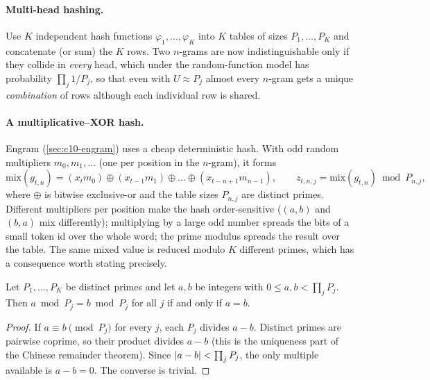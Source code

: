 \paragraph{Multi-head hashing.} Use $K$ independent hash functions $\varphi_1,\dots,\varphi_K$
into $K$ tables of sizes $P_1,\dots,P_K$ and concatenate (or sum) the $K$ rows. Two $n$-grams are
now indistinguishable only if they collide in \emph{every} head, which under the random-function
model has probability $\prod_j 1/P_j$, so that even with $U \approx P_j$ almost every $n$-gram
gets a unique \emph{combination} of rows although each individual row is shared.

\paragraph{A multiplicative--XOR hash.} Engram (\cref{sec:c10-engram}) uses a cheap deterministic
hash. With odd random multipliers $m_0, m_1, \dots$ (one per position in the $n$-gram), it forms
\begin{equation}
  \mathrm{mix}(g_{t,n}) = (x_t m_0) \oplus (x_{t-1} m_1) \oplus \dots \oplus (x_{t-n+1} m_{n-1}),
  \qquad
  z_{t,n,j} = \mathrm{mix}(g_{t,n}) \bmod P_{n,j},
  \label{eq:c10-mixhash}
\end{equation}
where $\oplus$ is bitwise exclusive-or and the table sizes $P_{n,j}$ are distinct primes. Different
multipliers per position make the hash order-sensitive ($(a,b)$ and $(b,a)$ mix differently);
multiplying by a large odd number spreads the bits of a small token id over the whole word; the
prime modulus spreads the result over the table. The same mixed value is reduced modulo $K$
different primes, which has a consequence worth stating precisely.

\begin{proposition}\label{prop:c10-crt}
Let $P_1,\dots,P_K$ be distinct primes and let $a, b$ be integers with $0 \le a, b < \prod_j P_j$.
Then $a \bmod P_j = b \bmod P_j$ for all $j$ if and only if $a = b$.
\end{proposition}
\begin{proof}
If $a \equiv b \pmod{P_j}$ for every $j$, each $P_j$ divides $a - b$. Distinct primes are pairwise
coprime, so their product divides $a-b$ (this is the uniqueness part of the Chinese remainder
theorem). Since $\left\lvert a - b\right\rvert < \prod_j P_j$, the only multiple available is $a - b = 0$. The
converse is trivial.
\end{proof}

